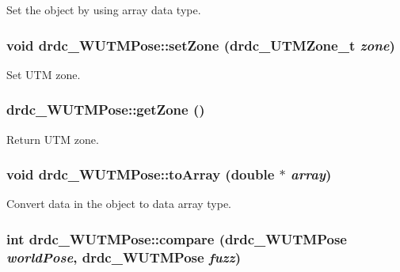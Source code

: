 Set the object by using array data type. 

\hypertarget{classdrdc__WUTMPose_43fbeedcfc4efffb0a0949fcd023f6c3}{
\subsubsection[setZone]{\setlength{\rightskip}{0pt plus 5cm}void drdc\_\-WUTMPose::setZone ({\bf drdc\_\-UTMZone\_\-t} {\em zone})}}
\label{classdrdc__WUTMPose_43fbeedcfc4efffb0a0949fcd023f6c3}


Set UTM zone. 

\hypertarget{classdrdc__WUTMPose_59bf0d0502a85f8f6447061ceacc34f8}{
\subsubsection[getZone]{ drdc\_\-WUTMPose::getZone ()}}
\label{classdrdc__WUTMPose_59bf0d0502a85f8f6447061ceacc34f8}


Return UTM zone. 

\hypertarget{classdrdc__WUTMPose_2f1f5dda8f09010eb6a17179f5031236}{
\subsubsection[toArray]{\setlength{\rightskip}{0pt plus 5cm}void drdc\_\-WUTMPose::toArray (double $\ast$ {\em array})}}
\label{classdrdc__WUTMPose_2f1f5dda8f09010eb6a17179f5031236}


Convert data in the object to data array type. 

\hypertarget{classdrdc__WUTMPose_b891de95d9a341b347fa16f0d93dfdf7}{
\subsubsection[compare]{\setlength{\rightskip}{0pt plus 5cm}int drdc\_\-WUTMPose::compare ({\bf drdc\_\-WUTMPose} {\em worldPose}, \/  {\bf drdc\_\-WUTMPose} {\em fuzz})}}
\label{classdrdc__WUTMPose_b891de95d9a341b347fa16f0d93dfdf7}


